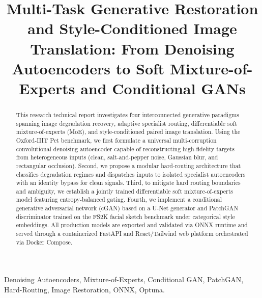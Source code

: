 \documentclass[conference]{IEEEtran}
\begin{document}
\title{Multi-Task Generative Restoration and Style-Conditioned Image Translation: From Denoising Autoencoders to Soft Mixture-of-Experts and Conditional GANs}

\author{
}

\maketitle

\begin{abstract}
This research technical report investigates four interconnected generative paradigms spanning image degradation recovery, adaptive specialist routing, differentiable soft mixture-of-experts (MoE), and style-conditioned paired image translation. Using the Oxford-IIIT Pet benchmark, we first formulate a universal multi-corruption convolutional denoising autoencoder capable of reconstructing high-fidelity targets from heterogeneous inputs (clean, salt-and-pepper noise, Gaussian blur, and rectangular occlusion). Second, we propose a modular hard-routing architecture that classifies degradation regimes and dispatches inputs to isolated specialist autoencoders with an identity bypass for clean signals. Third, to mitigate hard routing boundaries and ambiguity, we establish a jointly trained differentiable soft mixture-of-experts model featuring entropy-balanced gating. Fourth, we implement a conditional generative adversarial network (cGAN) based on a U-Net generator and PatchGAN discriminator trained on the FS2K facial sketch benchmark under categorical style embeddings. All production models are exported and validated via ONNX runtime and served through a containerized FastAPI and React/Tailwind web platform orchestrated via Docker Compose.
\end{abstract}

\begin{IEEEkeywords}
Denoising Autoencoders, Mixture-of-Experts, Conditional GAN, PatchGAN, Hard-Routing, Image Restoration, ONNX, Optuna.
\end{IEEEkeywords}
\end{document}
